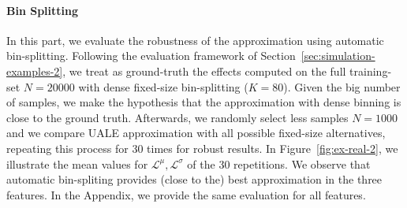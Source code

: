\documentclass[twoside]{article}
\begin{document}
\paragraph{Bin Splitting}

In this part, we evaluate the robustness of the approximation using
automatic bin-splitting. Following the evaluation framework of
Section~\ref{sec:simulation-examples-2}, we treat as ground-truth the
effects computed on the full training-set \(N=20000\) with dense
fixed-size bin-splitting (\(K=80\)). Given the big number of samples,
we make the hypothesis that the approximation with dense binning is
close to the ground truth. Afterwards, we randomly select less samples
\(N=1000\) and we compare UALE approximation with all possible
fixed-size alternatives, repeating this process for 30 times for
robust results. In Figure~\ref{fig:ex-real-2}, we illustrate the mean
values for \(\mathcal{L}^{\mu}, \mathcal{L}^{\sigma}\) of the 30
repetitions. We observe that automatic bin-spliting provides (close to
the) best approximation in the three features. In the Appendix, we
provide the same evaluation for all features.
\end{document}
